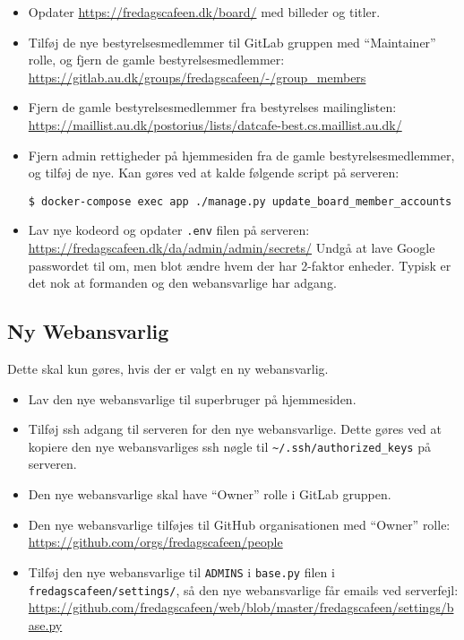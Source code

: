 \begin{itemize}
    \item Opdater \url{https://fredagscafeen.dk/board/} med billeder og titler.
    \item Tilføj de nye bestyrelsesmedlemmer til GitLab gruppen
    med ``Maintainer'' rolle, og fjern de gamle bestyrelsesmedlemmer:\\
    {\small\url{https://gitlab.au.dk/groups/fredagscafeen/-/group_members}}
    \item Fjern de gamle bestyrelsesmedlemmer fra bestyrelses mailinglisten:\\
    {\small\url{https://maillist.au.dk/postorius/lists/datcafe-best.cs.maillist.au.dk/}}
    \item Fjern admin rettigheder på hjemmesiden fra de gamle bestyrelsesmedlemmer, og tilføj de nye.
    Kan gøres ved at kalde følgende script på serveren:
    {\small\begin{verbatim}
$ docker-compose exec app ./manage.py update_board_member_accounts\end{verbatim}}
    \item Lav nye kodeord og opdater \texttt{.env} filen på serveren:\\
    {\small\url{https://fredagscafeen.dk/da/admin/admin/secrets/}}
    Undgå at lave Google passwordet til  om, men blot ændre hvem der har 
    2-faktor enheder. Typisk er det nok at formanden og den webansvarlige har adgang.
\end{itemize}

\subsection{Ny Webansvarlig}
\label{sec:ny-webansvarlig}

Dette skal kun gøres, hvis der er valgt en ny webansvarlig.
\begin{itemize}
    \item Lav den nye webansvarlige til superbruger på hjemmesiden.
    \item Tilføj ssh adgang til serveren for den nye webansvarlige.
    Dette gøres ved at kopiere den nye webansvarliges ssh nøgle til 
    \texttt{\textasciitilde/.ssh/authorized\_keys} på serveren.
    \item Den nye webansvarlige skal have ``Owner'' rolle i GitLab gruppen.
    \item Den nye webansvarlige tilføjes til GitHub organisationen med ``Owner'' rolle:\\
    {\small\url{https://github.com/orgs/fredagscafeen/people}}
    \item Tilføj den nye webansvarlige til \texttt{ADMINS} i \texttt{base.py} filen i\\
    \texttt{fredagscafeen/settings/}, så den nye webansvarlige får emails ved serverfejl:\\
    {\small\url{https://github.com/fredagscafeen/web/blob/master/fredagscafeen/settings/base.py}}
\end{itemize}

